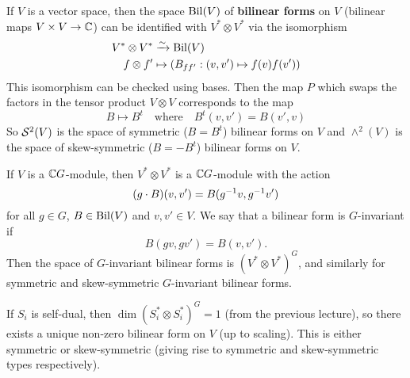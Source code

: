 If $V$ is a vector space, then the space $\operatorname{Bil}(V)$ of \textbf{bilinear forms} on $V$ (bilinear maps $V \times V \to \mathbb{C}$) can be identified with $V^* \otimes V^*$ via the isomorphism
\begin{align*}
  V^* \otimes V^* &\xrightarrow{\sim} \operatorname{Bil}(V) \\
  f \otimes f' &\mapsto \left( B_{ff'}: (v,v') \mapsto f(v)f(v') \right)
\end{align*}
This isomorphism can be checked using bases.
Then the map $P$ which swaps the factors in the tensor product $V \otimes V$ corresponds to the map
\[ B \mapsto B^t \quad\text{where}\quad B^t(v,v') = B(v',v) \]
So $\mathcal{S}^2(V)$ is the space of symmetric ($B=B^t$) bilinear forms on $V$ and $\wedge^2(V)$ is the space of skew-symmetric ($B=-B^t$) bilinear forms on $V$.

If $V$ is a $\mathbb{C} G$-module, then $V^* \otimes V^*$ is a $\mathbb{C} G$-module with the action
\[ (g \cdot B)(v,v') = B(g^{-1} v, g^{-1} v') \]
for all $g \in G$, $B \in \operatorname{Bil}(V)$ and $v, v' \in V$.
We say that a bilinear form is $G$-invariant if
\[ B(gv,gv')=B(v,v'). \]
Then the space of $G$-invariant bilinear forms is $(V^* \otimes V^*)^G$, and similarly for symmetric and skew-symmetric $G$-invariant bilinear forms.

If $S_i$ is self-dual, then $\dim(S_i^* \otimes S_i^*)^G=1$ (from the previous lecture), so there exists a unique non-zero bilinear form on $V$ (up to scaling).
This is either symmetric or skew-symmetric (giving rise to symmetric and skew-symmetric types respectively).

